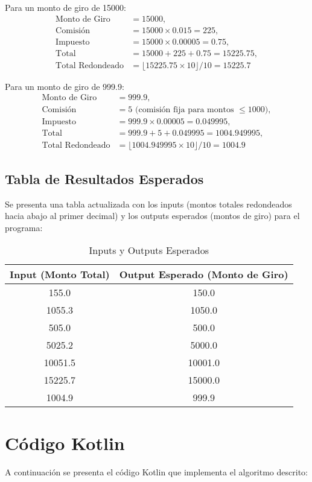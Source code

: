 \documentclass[11pt,a4paper]{article}
\begin{document}
Para un monto de giro de 15000:
\begin{align*}
\text{Monto de Giro} &= 15000, \\
\text{Comisión} &= 15000 \times 0.015 = 225, \\
\text{Impuesto} &= 15000 \times 0.00005 = 0.75, \\
\text{Total} &= 15000 + 225 + 0.75 = 15225.75, \\
\text{Total Redondeado} &= \lfloor 15225.75 \times 10 \rfloor / 10 = 15225.7
\end{align*}

Para un monto de giro de 999.9:
\begin{align*}
\text{Monto de Giro} &= 999.9, \\
\text{Comisión} &= 5 \text{ (comisión fija para montos } \leq 1000), \\
\text{Impuesto} &= 999.9 \times 0.00005 = 0.049995, \\
\text{Total} &= 999.9 + 5 + 0.049995 = 1004.949995, \\
\text{Total Redondeado} &= \lfloor 1004.949995 \times 10 \rfloor / 10 = 1004.9
\end{align*}

\subsection{Tabla de Resultados Esperados}
Se presenta una tabla actualizada con los inputs (montos totales redondeados hacia abajo al primer decimal) y los outputs esperados (montos de giro) para el programa:

\begin{table}[h]
\centering
\begin{tabular}{@{}cc@{}}
\toprule
\textbf{Input (Monto Total)} & \textbf{Output Esperado (Monto de Giro)} \\
\midrule
155.0 & 150.0 \\
1055.3 & 1050.0 \\
505.0 & 500.0 \\
5025.2 & 5000.0 \\
10051.5 & 10001.0 \\
15225.7 & 15000.0 \\
1004.9 & 999.9 \\
\bottomrule
\end{tabular}
\caption{Inputs y Outputs Esperados}
\end{table}

\section{Código Kotlin}
A continuación se presenta el código Kotlin que implementa el algoritmo descrito:
\end{document}
